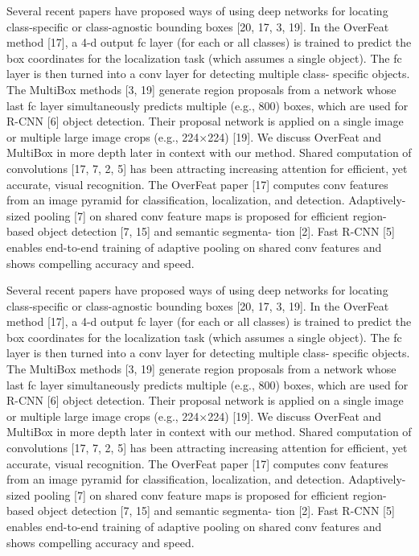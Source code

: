 Several recent papers have proposed ways of using deep networks for locating class-specific or class-agnostic bounding boxes [20, 17, 3, 19]. In the OverFeat method [17], a 4-d output fc layer (for each or all classes) is trained to predict the box coordinates for the localization task (which assumes a single object). The fc layer is then turned into a conv layer for detecting multiple class- specific objects. The MultiBox methods [3, 19] generate region proposals from a network whose last fc layer simultaneously predicts multiple (e.g., 800) boxes, which are used for R-CNN [6] object detection. Their proposal network is applied on a single image or multiple large image crops (e.g., 224×224) [19]. We discuss OverFeat and MultiBox in more depth later in context with our method.
Shared computation of convolutions [17, 7, 2, 5] has been attracting increasing attention for efficient, yet accurate, visual recognition. The OverFeat paper [17] computes conv features from an image pyramid for classification, localization, and detection. Adaptively-sized pooling [7] on shared conv feature maps is proposed for efficient region-based object detection [7, 15] and semantic segmenta- tion [2]. Fast R-CNN [5] enables end-to-end training of adaptive pooling on shared conv features and shows compelling accuracy and speed.

Several recent papers have proposed ways of using deep networks for locating class-specific or class-agnostic bounding boxes [20, 17, 3, 19]. In the OverFeat method [17], a 4-d output fc layer (for each or all classes) is trained to predict the box coordinates for the localization task (which assumes a single object). The fc layer is then turned into a conv layer for detecting multiple class- specific objects. The MultiBox methods [3, 19] generate region proposals from a network whose last fc layer simultaneously predicts multiple (e.g., 800) boxes, which are used for R-CNN [6] object detection. Their proposal network is applied on a single image or multiple large image crops (e.g., 224×224) [19]. We discuss OverFeat and MultiBox in more depth later in context with our method.
Shared computation of convolutions [17, 7, 2, 5] has been attracting increasing attention for efficient, yet accurate, visual recognition. The OverFeat paper [17] computes conv features from an image pyramid for classification, localization, and detection. Adaptively-sized pooling [7] on shared conv feature maps is proposed for efficient region-based object detection [7, 15] and semantic segmenta- tion [2]. Fast R-CNN [5] enables end-to-end training of adaptive pooling on shared conv features and shows compelling accuracy and speed.

